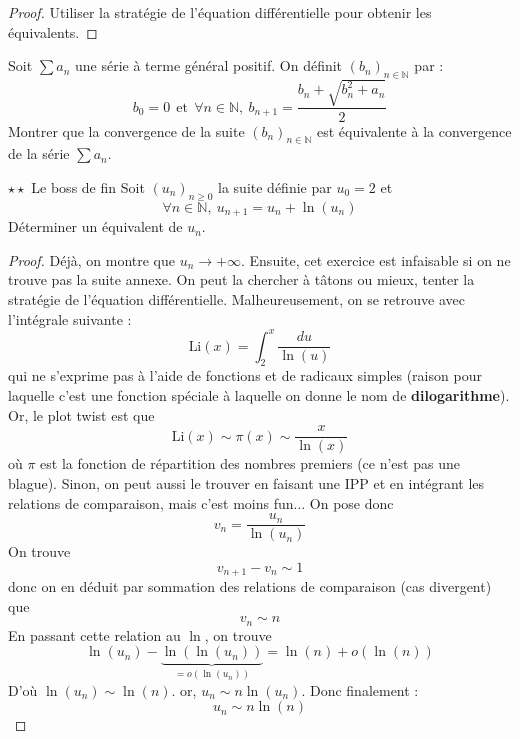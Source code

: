 \documentclass[french,a4paper]{article}
\newcommand{\N}{\mathbb{N}}
\theoremstyle{plain}
\theoremstyle{definition}
\theoremstyle{remark}
\begin{document}
\begin{proof}
	Utiliser la stratégie de l'équation différentielle pour obtenir les équivalents.
\end{proof}

\begin{ex}[Moulin.61]{}
	Soit $\displaystyle\sum a_n$ une série à terme général positif. On définit $(b_n)_{n\in\N}$ par : $$b_0=0\ \ \text{et}\ \ \forall n\in\N,\ b_{n+1}=\frac{b_n+\sqrt{b_n^2+a_n}}{2}$$ Montrer que la convergence de la suite $(b_n)_{n\in\N}$ est équivalente à la convergence de la série $\displaystyle\sum a_n$.
\end{ex}

\begin{ex}[Moulin.62]{$\star\star$ Le boss de fin}
	Soit $(u_n)_{n\geqslant0}$ la suite définie par $u_0=2$ et $$\forall n\in\N,\ u_{n+1}=u_n+\ln(u_n)$$ Déterminer un équivalent de $u_n$.
\end{ex}
\begin{proof}
	Déjà, on montre que $u_n\to+\infty$. Ensuite, cet exercice est infaisable si on ne trouve pas la suite annexe. On peut la chercher à tâtons ou mieux, tenter la stratégie de l'équation différentielle. Malheureusement, on se retrouve avec l'intégrale suivante : $$\text{Li}(x)=\int_{2}^{x}\frac{du}{\ln(u)}$$ qui ne s'exprime pas à l'aide de fonctions et de radicaux simples (raison pour laquelle c'est une fonction spéciale à laquelle on donne le nom de \textbf{dilogarithme}). Or, le plot twist est que $$\text{Li}(x)\sim\pi(x)\sim\frac{x}{\ln(x)}$$ où $\pi$ est la fonction de répartition des nombres premiers (ce n'est pas une blague). Sinon, on peut aussi le trouver en faisant une IPP et en intégrant les relations de comparaison, mais c'est moins fun... On pose donc $$v_n=\frac{u_n}{\ln(u_n)}$$ On trouve $$v_{n+1}-v_n\sim 1$$ donc on en déduit par sommation des relations de comparaison (cas divergent) que $$v_n\sim n$$ En passant cette relation au $\ln$, on trouve $$\ln(u_n)-\underbrace{\ln(\ln(u_n))}_{=o(\ln(u_n))}=\ln(n)+o(\ln(n))$$ D'où $\ln(u_n)\sim\ln(n)$. or, $u_n\sim n\ln(u_n)$. Donc finalement : $$u_n\sim n\ln(n)$$
\end{proof}
\end{document}
